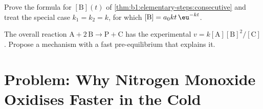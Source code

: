 \begin{exercise}[$\star\star\star$]\label{exo:b1:elementary-steps:11}
Prove the formula for $[\mathrm{B}](t)$ of
\cref{thm:b1:elementary-steps:consecutive} and treat the special case
$k_1 = k_2 = k$, for which $[\mathrm{B}] = a_0kt\,\eu^{-kt}$.
\end{exercise}

\begin{exercise}[$\star\star\star$]\label{exo:b1:elementary-steps:12}
The overall reaction $\mathrm{A} + 2\,\mathrm{B} \to \mathrm{P} +
\mathrm{C}$ has the experimental  $v =
k[\mathrm{A}][\mathrm{B}]^2/[\mathrm{C}]$. Propose a mechanism with a fast
pre-equilibrium that explains it.
\end{exercise}

\section{Problem: Why Nitrogen Monoxide Oxidises Faster in the Cold}

